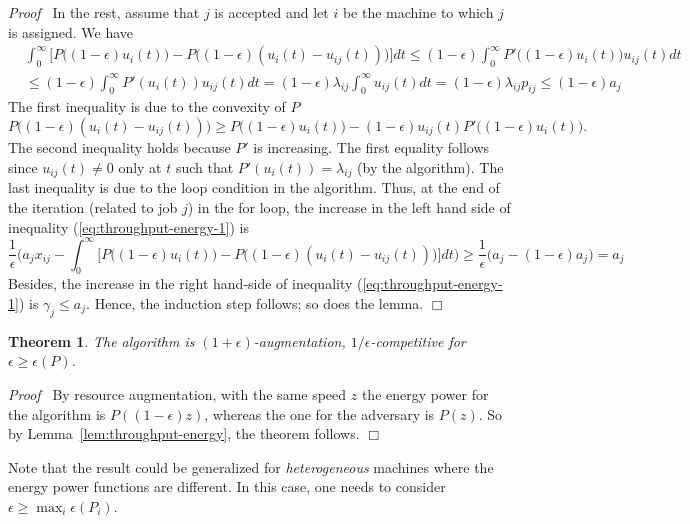 \documentclass[11pt]{article}
\newenvironment{proof}{\noindent\emph{Proof\ }}{\hspace*{\fill}$\Box$\medskip}
\newtheorem{theorem}{Theorem}
\begin{document}
\begin{proof}
In the rest, assume that $j$ is accepted and let $i$ be the machine 
to which $j$ is assigned. 
We have
\begin{align*}
& \int_{0}^{\infty} \biggl[ P\biggl((1-\epsilon)u_{i}(t) \biggl) - P\biggl((1-\epsilon)(u_{i}(t) - u_{ij}(t)) \biggl) \biggl] dt
\leq (1-\epsilon) \int_{0}^{\infty} P'\biggl( (1-\epsilon)u_{i}(t) \biggl) u_{ij}(t) dt \\
&\leq (1-\epsilon) \int_{0}^{\infty} P'(u_{i}(t)) u_{ij}(t) dt 
= (1-\epsilon) \lambda_{ij} \int_{0}^{\infty} u_{ij}(t) dt 
= (1-\epsilon) \lambda_{ij} p_{ij} \leq (1-\epsilon) a_{j}
\end{align*}
The first inequality is due to the convexity of $P$
$$
P\biggl( (1-\epsilon)(u_{i}(t) - u_{ij}(t)) \biggl) 
	\geq P\biggl( (1-\epsilon)u_{i}(t) \biggl) - (1-\epsilon)u_{ij}(t)P'\biggl( (1-\epsilon)u_{i}(t) \biggl).
$$ 
The second inequality holds because $P'$ is increasing. 
The first equality follows since
$u_{ij}(t) \neq 0$ only at $t$ such that $P'(u_{i}(t)) = \lambda_{ij}$ (by the algorithm).     
The last inequality is due to the loop condition in the algorithm.
Thus, at the end of the iteration (related to job $j$) in the for loop,
the increase in the left hand side of inequality (\ref{eq:throughput-energy-1}) is
$$
\frac{1}{\epsilon} 
\biggl( a_{j}x_{ij} - \int_{0}^{\infty} \biggl[ P\biggl((1-\epsilon)u_{i}(t) \biggl) 
					- P\biggl((1-\epsilon)(u_{i}(t) - u_{ij}(t)) \biggl) \biggl] dt \biggl)
\geq \frac{1}{\epsilon} \biggl( a_{j} - (1-\epsilon)a_{j} \biggl) = a_{j}
$$ 
Besides, the increase in the right hand-side of inequality (\ref{eq:throughput-energy-1}) is 
$\gamma_{j} \leq a_{j}$.
Hence, the induction step follows; so does the lemma.
\end{proof}


\begin{theorem}
The algorithm is $(1+\epsilon)$-augmentation, $1/\epsilon$-competitive
for $\epsilon \geq \epsilon(P)$. 
\end{theorem}
\begin{proof}
By resource augmentation, with the same speed $z$ the energy power 
for the algorithm is $P((1-\epsilon)z)$, 
whereas the one for the adversary is $P(z)$. So by 
Lemma~\ref{lem:throughput-energy}, the theorem follows.
\end{proof}

Note that the result could be generalized for \emph{heterogeneous} machines 
where the energy power functions are different. In this case, one needs to consider 
$\epsilon \geq \max_{i} \epsilon(P_{i})$.
\end{document}
